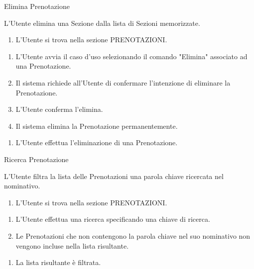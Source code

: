 {\ucExtTable	%
{	%
    Elimina Prenotazione
    
}{	%
    
}{	%
    L'Utente elimina una Sezione dalla lista di Sezioni memorizzate.
    
}{	%
    \attori
}{	%
    \begin{enumerate}
        \item L'Utente si trova nella sezione PRENOTAZIONI.
    \end{enumerate}
    
}{	%
    \begin{enumerate}
        \item L'Utente avvia il caso d'uso selezionando il comando "Elimina" associato ad una Prenotazione.
        \item Il sistema richiede all'Utente di confermare l'intenzione di eliminare la Prenotazione.
        \item L'Utente conferma l'elimina.
        \item Il sistema elimina la Prenotazione permanentemente.
    \end{enumerate}
    
}{	%
    \begin{enumerate}
        \item L'Utente effettua l'eliminazione di una Prenotazione.
    \end{enumerate}
		
} }


{\ucExtTable	%
{	%
	Ricerca Prenotazione
	
}{	%
	
}{	%
	L'Utente filtra la lista delle Prenotazioni una parola chiave ricercata nel nominativo.
	
}{	%
	\attori
	
}{	%
	\begin{enumerate}
        \item L'Utente si trova nella sezione PRENOTAZIONI.
    \end{enumerate}
	
}{	%
	\begin{enumerate}
        \item L'Utente effettua una ricerca specificando una chiave di ricerca.
        \item Le Prenotazioni che non contengono la parola chiave nel suo nominativo non vengono incluse nella lista risultante.
    \end{enumerate}
	
}{	%
	\begin{enumerate}
        \item La lista risultante è filtrata. %
    \end{enumerate}
	
} }

